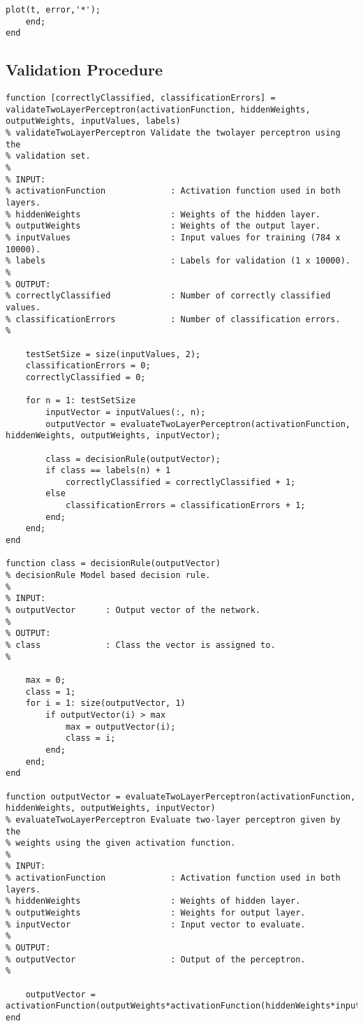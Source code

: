 \begin{appendices}
\begin{lstlisting}[label={lst:train-two-layer-perceptron}]
        plot(t, error,'*');
    end;
end
\end{lstlisting}

\subsection{Validation Procedure}

\begin{lstlisting}[label={lst:validation}]
function [correctlyClassified, classificationErrors] = validateTwoLayerPerceptron(activationFunction, hiddenWeights, outputWeights, inputValues, labels)
% validateTwoLayerPerceptron Validate the twolayer perceptron using the
% validation set.
%
% INPUT:
% activationFunction             : Activation function used in both layers.
% hiddenWeights                  : Weights of the hidden layer.
% outputWeights                  : Weights of the output layer.
% inputValues                    : Input values for training (784 x 10000).
% labels                         : Labels for validation (1 x 10000).
%
% OUTPUT:
% correctlyClassified            : Number of correctly classified values.
% classificationErrors           : Number of classification errors.
% 

    testSetSize = size(inputValues, 2);
    classificationErrors = 0;
    correctlyClassified = 0;
    
    for n = 1: testSetSize
        inputVector = inputValues(:, n);
        outputVector = evaluateTwoLayerPerceptron(activationFunction, hiddenWeights, outputWeights, inputVector);
        
        class = decisionRule(outputVector);
        if class == labels(n) + 1
            correctlyClassified = correctlyClassified + 1;
        else
            classificationErrors = classificationErrors + 1;
        end;
    end;
end

function class = decisionRule(outputVector)
% decisionRule Model based decision rule.
%
% INPUT:
% outputVector      : Output vector of the network.
%
% OUTPUT:
% class             : Class the vector is assigned to.
%

    max = 0;
    class = 1;
    for i = 1: size(outputVector, 1)
        if outputVector(i) > max
            max = outputVector(i);
            class = i;
        end;
    end;
end

function outputVector = evaluateTwoLayerPerceptron(activationFunction, hiddenWeights, outputWeights, inputVector)
% evaluateTwoLayerPerceptron Evaluate two-layer perceptron given by the
% weights using the given activation function.
%
% INPUT:
% activationFunction             : Activation function used in both layers.
% hiddenWeights                  : Weights of hidden layer.
% outputWeights                  : Weights for output layer.
% inputVector                    : Input vector to evaluate.
%
% OUTPUT:
% outputVector                   : Output of the perceptron.
% 

    outputVector = activationFunction(outputWeights*activationFunction(hiddenWeights*inputVector));
end
\end{lstlisting}

\end{appendices}